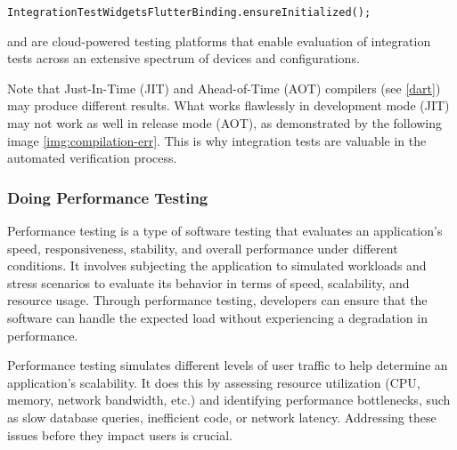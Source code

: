 \begin{lstlisting}
IntegrationTestWidgetsFlutterBinding.ensureInitialized();
\end{lstlisting}

\noindent {} and  are cloud-powered testing platforms that enable evaluation of integration tests across an extensive spectrum of devices and configurations.

Note that Just-In-Time (JIT) and Ahead-of-Time (AOT) compilers (see \ref{dart}) may produce different results. What 
works flawlessly in development mode (JIT) may not work as well in release mode (AOT), as demonstrated by the following 
image \cref{img:compilation-err}. This is why integration tests are valuable in the automated verification process.


\subsubsection{Doing Performance Testing}

Performance testing is a type of software testing that evaluates an application's speed, responsiveness, stability, and 
overall performance under different conditions. It involves subjecting the application to simulated workloads and stress 
scenarios to evaluate its behavior in terms of speed, scalability, and resource usage. Through performance testing, 
developers can ensure that the software can handle the expected load without experiencing a degradation in performance.

Performance testing simulates different levels of user traffic to help determine an application's scalability. It does 
this by assessing resource utilization (CPU, memory, network bandwidth, etc.) and identifying performance bottlenecks, 
such as slow database queries, inefficient code, or network latency. Addressing these issues before they impact users is 
crucial.

